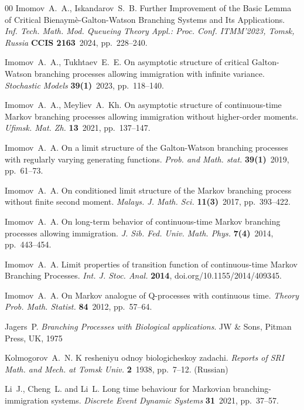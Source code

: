 \documentclass[10pt,reqno]{amsart}
\theoremstyle{definition}
\numberwithin{equation}{section}
\begin{document}
\begin{thebibliography}{00}
    {\sc Imomov~A.~A., Iskandarov~S.~B.}
    {Further Improvement of the Basic Lemma of Critical Bienaym\`{e}-Galton-Watson Branching Systems and Its Applications.}
    \textit{Inf. Tech. Math. Mod. Queueing Theory Appl.: Proc. Conf. ITMM'2023, Tomsk, Russia} \textbf{CCIS 2163}~2024, pp.~228--240.

    {\sc Imomov~A.~A., Tukhtaev~E.~E.}
    {On asymptotic structure of critical Galton-Watson branching processes allowing immigration with infinite variance.}
    \textit{Stochastic Models} \textbf{39(1)}~2023, pp.~118--140.

    {\sc Imomov~A.~A., Meyliev~A.~Kh.}
    {On asymptotic structure of continuous-time Markov
    branching processes allowing immigration without higher-order moments.}
    \textit{Ufimsk. Mat. Zh.} \textbf{13}~2021, pp.~137--147.

    {\sc Imomov~A.~A.}
    {On a limit structure of the Galton-Watson branching processes with regularly varying generating functions.}
    \textit{Prob. and Math. stat.} \textbf{39(1)}~2019, pp.~61--73.

    {\sc Imomov~A.~A.}
    {On conditioned limit structure of the Markov branching process without finite second moment.}
    \textit{Malays. J. Math. Sci.} \textbf{11(3)}~2017, pp.~393--422.

    {\sc Imomov~A.~A.}
    {On long-term behavior of continuous-time Markov branching processes allowing immigration.}
    \textit{J. Sib. Fed. Univ. Math. Phys.} {\textbf{7(4)}}~2014, pp.~443--454.

    {\sc Imomov~A.~A.}
    {Limit properties of transition function of continuous-time Markov Branching Processes.}
    \textit{Int. J. Stoc. Anal.} {\textbf{2014}}, doi.org/10.1155/2014/409345.

    {\sc Imomov~A.~A.}
    {On Markov analogue of Q-processes with continuous time.}
    \textit{Theory Prob. Math. Statist.} \textbf{84}~2012, pp.~57--64.

    {\sc Jagers~P}.
    \textit{Branching Processes with Biological applications}. JW \& Sons, Pitman Press, UK, 1975

    {\sc Kolmogorov~A.~N.}
    {K resheniyu odnoy biologicheskoy zadachi.}
    \textit{Reports of SRI Math. and Mech. at Tomsk Univ.}  \textbf{2}~1938, pp.~7--12. (Russian)

    {\sc Li~J., Cheng~L. and Li~L.}
    {Long time behaviour for Markovian branching-immigration systems.}
    \textit{Discrete Event Dynamic Systems} \textbf{31}~2021, pp.~37--57.


\end{thebibliography}
\end{document}
